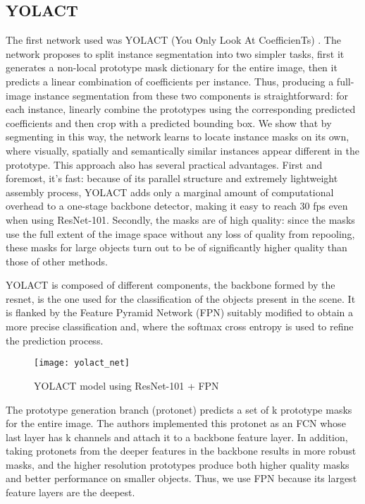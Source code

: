 \subsection{YOLACT}
The first network used was YOLACT (You Only Look At CoefficienTs) \cite{bolya2019yolact}. The network proposes to split instance segmentation into two simpler tasks,
first it generates a non-local prototype mask dictionary for the entire image, then it predicts a linear combination of coefficients per instance. Thus, producing
a full-image instance segmentation from these two components is straightforward: for each instance, linearly combine the prototypes using the corresponding
predicted coefficients and then crop with a predicted bounding box. We show that by segmenting in this way, the network learns to locate instance masks on its own,
where visually, spatially and semantically similar instances appear different in the prototype. This approach also has several practical advantages.
First and foremost, it’s fast: because of its parallel structure and extremely lightweight assembly process, YOLACT adds only a marginal amount of computational overhead to
a one-stage backbone detector, making it easy to reach 30 fps even when using ResNet-101. Secondly, the masks are of high quality: since the masks use the full extent of
the image space without any loss of quality from repooling, these masks for large objects turn out to be of significantly higher quality than those of other methods.

YOLACT is composed of different components, the backbone formed by the resnet, is the one used for the classification of the objects present in the scene.
It is flanked by the Feature Pyramid Network (FPN) suitably modified to obtain a more precise classification and, where the softmax cross entropy is used to refine
the prediction process.

\begin{figure}[ht]
    \centering
    \texttt{[image: yolact\_net]} 
    \caption{YOLACT model using ResNet-101 + FPN}
\end{figure}

The prototype generation branch (protonet) predicts a set of k prototype masks for the entire image. The authors implemented this protonet as an FCN whose last layer
has k channels and attach it to a backbone feature layer. In addition, taking protonets from the deeper features in the backbone results in more robust masks, and the
higher resolution prototypes produce both higher quality masks and better performance on smaller objects. Thus, we use FPN because its largest feature layers are the deepest.

